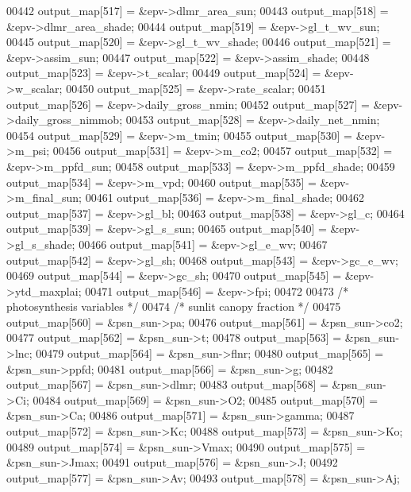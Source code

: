 \begin{DoxyCode}
00442         output\_map[517] = &epv->dlmr\_area\_sun;
00443         output\_map[518] = &epv->dlmr\_area\_shade;
00444         output\_map[519] = &epv->gl\_t\_wv\_sun;
00445         output\_map[520] = &epv->gl\_t\_wv\_shade;
00446         output\_map[521] = &epv->assim\_sun;
00447         output\_map[522] = &epv->assim\_shade;
00448         output\_map[523] = &epv->t\_scalar;
00449         output\_map[524] = &epv->w\_scalar;
00450         output\_map[525] = &epv->rate\_scalar;
00451         output\_map[526] = &epv->daily\_gross\_nmin;
00452         output\_map[527] = &epv->daily\_gross\_nimmob;
00453         output\_map[528] = &epv->daily\_net\_nmin;
00454         output\_map[529] = &epv->m\_tmin;
00455         output\_map[530] = &epv->m\_psi;
00456         output\_map[531] = &epv->m\_co2;
00457         output\_map[532] = &epv->m\_ppfd\_sun;
00458         output\_map[533] = &epv->m\_ppfd\_shade;
00459         output\_map[534] = &epv->m\_vpd;
00460         output\_map[535] = &epv->m\_final\_sun;
00461         output\_map[536] = &epv->m\_final\_shade;
00462         output\_map[537] = &epv->gl\_bl;
00463         output\_map[538] = &epv->gl\_c;
00464         output\_map[539] = &epv->gl\_s\_sun;
00465         output\_map[540] = &epv->gl\_s\_shade;
00466         output\_map[541] = &epv->gl\_e\_wv;
00467         output\_map[542] = &epv->gl\_sh;
00468         output\_map[543] = &epv->gc\_e\_wv;
00469         output\_map[544] = &epv->gc\_sh;
00470         output\_map[545] = &epv->ytd\_maxplai;
00471         output\_map[546] = &epv->fpi;
00472                 
00473         \textcolor{comment}{/* photosynthesis variables */}
00474         \textcolor{comment}{/* sunlit canopy fraction */}
00475         output\_map[560] = &psn\_sun->pa;
00476         output\_map[561] = &psn\_sun->co2;
00477         output\_map[562] = &psn\_sun->t;
00478         output\_map[563] = &psn\_sun->lnc;
00479         output\_map[564] = &psn\_sun->flnr;
00480         output\_map[565] = &psn\_sun->ppfd;
00481         output\_map[566] = &psn\_sun->g;
00482         output\_map[567] = &psn\_sun->dlmr;
00483         output\_map[568] = &psn\_sun->Ci;
00484         output\_map[569] = &psn\_sun->O2;
00485         output\_map[570] = &psn\_sun->Ca;
00486         output\_map[571] = &psn\_sun->gamma;
00487         output\_map[572] = &psn\_sun->Kc;
00488         output\_map[573] = &psn\_sun->Ko;
00489         output\_map[574] = &psn\_sun->Vmax;
00490         output\_map[575] = &psn\_sun->Jmax;
00491         output\_map[576] = &psn\_sun->J;
00492         output\_map[577] = &psn\_sun->Av;
00493         output\_map[578] = &psn\_sun->Aj;

\end{DoxyCode}
